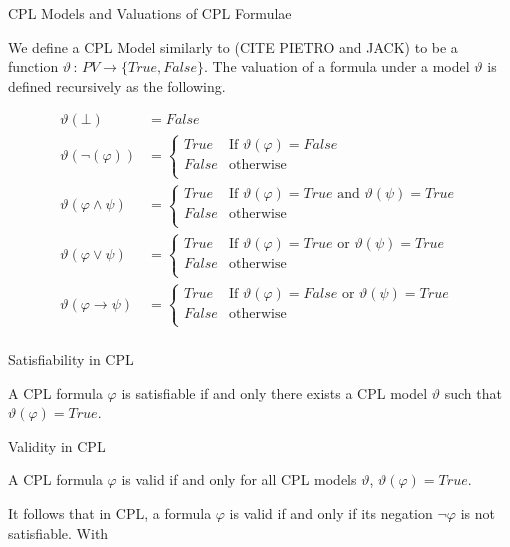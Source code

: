 \documentclass{llncs}
\begin{document}
\begin{definition}{CPL Models and Valuations of CPL Formulae}\label{CPL Model}

We define a CPL Model similarly to (CITE PIETRO and JACK) to be a function
$\vartheta \, : \, PV \rightarrow \{True, False\}$. The valuation of a formula
under a model $\vartheta$ is defined recursively as the following.

\begin{align*}
\vartheta (\bot) &= False \\
\vartheta (\neg(\varphi)) &=
\begin{cases}
True & \textrm{If } \vartheta(\varphi) = False \\
False & \textrm{otherwise} \\
\end{cases} \\
\vartheta (\varphi \wedge \psi) &=
\begin{cases}
True & \textrm{If } \vartheta(\varphi) = True \textrm{ and } \vartheta(\psi) = True \\
False & \textrm{otherwise} \\
\end{cases} \\
\vartheta (\varphi \vee \psi) &=
\begin{cases}
True & \textrm{If } \vartheta(\varphi) = True \textrm{ or } \vartheta(\psi) = True \\
False & \textrm{otherwise} \\
\end{cases} \\
\vartheta (\varphi \rightarrow \psi) &=
\begin{cases}
True & \textrm{If } \vartheta(\varphi) = False \textrm{ or } \vartheta(\psi) = True \\
False & \textrm{otherwise} \\
\end{cases} \\
\end{align*}
\end{definition}

\begin{definition}{Satisfiability in CPL}\label{Satisfiability in CPL}

A CPL formula $\varphi$ is satisfiable if and only there exists a CPL model
$\vartheta$ such that $\vartheta(\varphi) = True$.
\end{definition}

\begin{definition}{Validity in CPL}\label{Validity in CPL}

A CPL formula $\varphi$ is valid if and only for all CPL models
$\vartheta$, $\vartheta(\varphi) = True$.

It follows that in CPL, a formula $\varphi$ is valid if and only if its negation
$\neg \varphi$ is not satisfiable. With
\end{definition}
\end{document}
